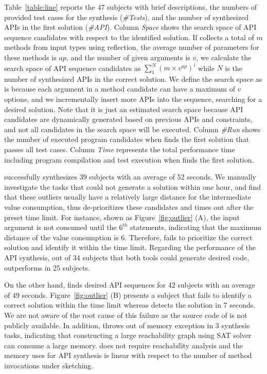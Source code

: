   Table~\ref{table:line} reports the 47 subjects with brief descriptions, the numbers of provided test cases for the synthesis (\textit{\#Tests}), and the number of synthesized  APIs in the first solution (\textit{\#API}).   Column {\it Space} shows the search space of API sequence candidates with respect to the identified solution.  If \tool collects a total of $m$ methods from input types using reflection, the average number of parameters for these methods is $ap$, and the number of given arguments is $v$,  we calculate the search space of API sequence candidates as $\sum_{1}^{N} (m \times v^{ap})^i$ while $N$ is the number of synthesized APIs  in the correct solution. We define the search space as is because each argument in a method candidate can have a maximum of $v$ options, and we incrementally insert more APIs into the sequence, searching for a desired solution.   Note that it is just an estimated search space because API candidates are dynamically generated based on previous APIs and constraints, and not all candidates in the search space will be executed.  Column   \textit{\#Run} shows the number of executed program candidates when \tool finds the first solution that passes all test cases.  Column \textit{Time} represents the total performance time including program compilation and test execution when \tool finds the first solution. 

\tool successfully synthesizes 39 subjects with an average of 52 seconds. We manually investigate the tasks that \tool could not generate a solution within one hour, and find that these outliers usually have a relatively large distance for the intermediate value consumption, thus \tool de-prioritizes these candidates and times out after the preset time limit. For instance, shown as Figure~\ref{fig:outlier}  (A), the input argument  is not consumed until the $6^{th}$ statements, indicating that the maximum distance of the value consumption is 6. Therefore, \tool fails to prioritize the correct solution and identify it within the time limit.  Regarding the performance of the API synthesis,   out of 34 subjects that both tools could generate desired code, \tool outperforms \spt in 25 subjects. %






On the other hand,  \spt finds desired API sequences for 42 subjects with an average of 49 seconds. Figure~\ref{fig:outlier}  (B)  presents a subject that \spt fails to identify a correct solution within the time limit whereas \tool detects the solution in 7 seconds. We are not aware of the root cause of this failure as the source code of \spt is not publicly available.  In addition,  \spt throws out of memory exception in 3 synthesis tasks, indicating that constructing a large reachability graph using SAT solver can consume a large memory.   \tool does not require reachability analysis and the memory \tool uses for API synthesis is linear with respect to the number of method invocations under sketching. 


